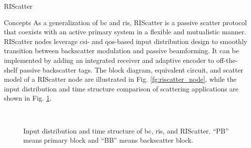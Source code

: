 \documentclass[journal]{IEEEtran}
\begin{document}
\begin{section}{RIScatter}
	\begin{subsection}{Concepts}
		As a generalization of \gls{bc} and \gls{ris}, RIScatter is a passive scatter protocol that coexists with an active primary system in a flexible and mutualistic manner.
		RIScatter nodes leverage \gls{csi}- and \gls{qos}-based input distribution design to smoothly transition between backscatter modulation and passive beamforming.
		It can be implemented by adding an integrated receiver \cite{Kim2021a} and adaptive encoder \cite{He2020e} to off-the-shelf passive backscatter tags.
		The block diagram, equivalent circuit, and scatter model of a RIScatter node are illustrated in Fig. \ref{fg:riscatter_node}, while the input distribution and time structure comparison of scattering applications are shown in Fig. \ref{fg:scatter_comparison}.
		\begin{figure*}[!t]
			\centering
			\caption{
			Block diagram, equivalent circuit, and scatter model of a RIScatter node.
			The solid and dashed vectors represent signal and energy flows.
			The scatter antenna behaves as a constant power source, where the voltage $V_0$ and current $I_0$ are introduced by incident electric field $\vec{E}_{\text{I}}$ and magnetic field $\vec{H}_{\text{I}}$ \cite{Huang2021}.
			}
			\label{fg:riscatter_node}
		\end{figure*}
		\begin{figure}[!t]
			\centering
			\\
			\caption{
				Input distribution and time structure of \gls{bc}, \gls{ris}, and RIScatter.
				``PB'' means primary block and ``BB'' means backscatter block.
			}
			\label{fg:scatter_comparison}
		\end{figure}

\end{subsection}
\end{section}
\end{document}
